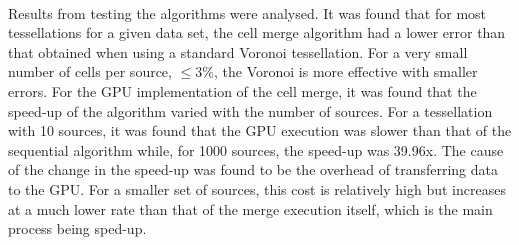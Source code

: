 \\
Results from testing the algorithms were analysed. It was found that for most tessellations for a given data set, the cell merge algorithm had a lower error than that obtained when using a standard Voronoi tessellation. For a very small number of cells per source, $\leq 3\%$, the Voronoi is more effective with smaller errors. For the GPU implementation of the cell merge, it was found that the speed-up of the algorithm varied with the number of sources. For a tessellation with 10 sources, it was found that the GPU execution was slower than that of the sequential algorithm while, for 1000 sources, the speed-up was 39.96x. The cause of the change in the speed-up was found to be the overhead of transferring data to the GPU. For a smaller set of sources, this cost is relatively high but increases at a much lower rate than that of the merge execution itself, which is the main process being sped-up.